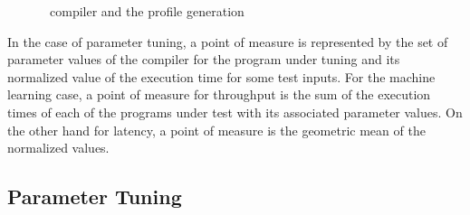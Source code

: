 \begin{figure}
  \centering
  
  \begin{minipage}[t]{\linewidth}
  \end{minipage}
  \caption{\CP\ compiler and the profile generation}
  \label{fig:CPview}
\end{figure}


In the case of parameter tuning, a point of measure is represented by
the set of parameter values of the compiler for the program under tuning
and its normalized value of the execution time for some test inputs. For
the machine learning case, a point of measure for throughput is the sum
of the execution times of each of the programs under test with its
associated parameter values. On the other hand for latency, a point of
measure is the geometric mean of the normalized values.

\subsection{Parameter Tuning}

